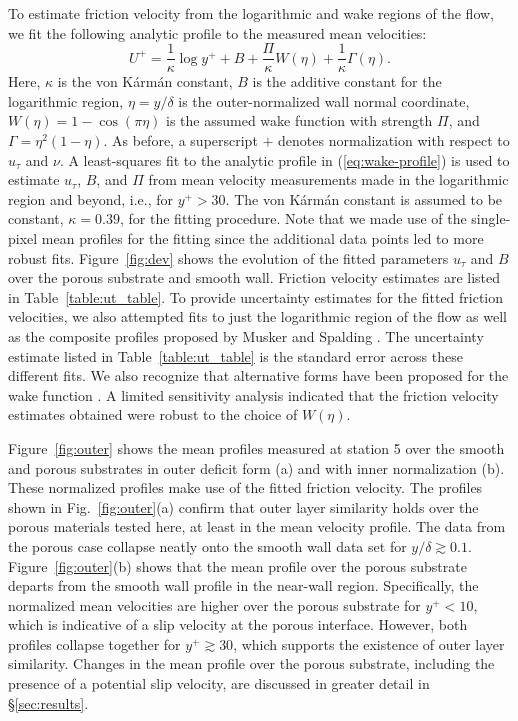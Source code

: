 \documentclass[letterpaper,11pt]{article}
\begin{document}
To estimate friction velocity from the logarithmic and wake regions of the flow, we fit the following analytic profile \citep{coles1956law,musker1979explicit,chauhan2009criteria} to the measured mean velocities:
\begin{equation}\label{eq:wake-profile}
U^+ = \frac{1}{\kappa} \log y^+ + B + \frac{\Pi}{\kappa} W(\eta) + \frac{1}{\kappa}\Gamma(\eta). 
\end{equation}
Here, $\kappa$ is the von K\'arm\'an constant, $B$ is the additive constant for the logarithmic region, $\eta = y/\delta$ is the outer-normalized wall normal coordinate, $W(\eta) = 1 - \cos(\pi\eta)$ is the assumed wake function with strength $\Pi$, and $\Gamma = \eta^2 (1-\eta)$. As before, a superscript $+$ denotes normalization with respect to $u_\tau$ and $\nu$.  A least-squares fit to the analytic profile in (\ref{eq:wake-profile}) is used to estimate $u_\tau$, $B$, and $\Pi$ from mean velocity measurements made in the logarithmic region and beyond, i.e., for $y^+ > 30$. The von K\'arm\'an constant is assumed to be constant, $\kappa = 0.39$, for the fitting procedure. Note that we made use of the single-pixel mean profiles for the fitting since the additional data points led to more robust fits.  Figure~\ref{fig:dev} shows the evolution of the fitted parameters $u_\tau$ and $B$ over the porous substrate and smooth wall.  Friction velocity estimates are listed in Table~\ref{table:ut_table}.  To provide uncertainty estimates for the fitted friction velocities, we also attempted fits to just the logarithmic region of the flow as well as the composite profiles proposed by Musker and Spalding \citep{clauser1956turbulent,musker1979explicit,kendall2006method,rodriguez2015robust}. The uncertainty estimate listed in Table~\ref{table:ut_table} is the standard error across these different fits. We also recognize that alternative forms have been proposed for the wake function \citep{chauhan2009criteria}.  A limited sensitivity analysis indicated that the friction velocity estimates obtained were robust to the choice of $W(\eta)$. 

Figure~\ref{fig:outer} shows the mean profiles measured at station 5 over the smooth and porous substrates in outer deficit form (a) and with inner normalization (b). These normalized profiles make use of the fitted friction velocity. The profiles shown in Fig.~\ref{fig:outer}(a) confirm that outer layer similarity holds over the porous materials tested here, at least in the mean velocity profile. The data from the porous case collapse neatly onto the smooth wall data set for $y/\delta \gtrsim 0.1$.  Figure~\ref{fig:outer}(b) shows that the mean profile over the porous substrate departs from the smooth wall profile in the near-wall region. Specifically, the normalized mean velocities are higher over the porous substrate for $y^+ < 10$, which is indicative of a slip velocity at the porous interface. However, both profiles collapse together for $y^+ \gtrsim 30$, which supports the existence of outer layer similarity. Changes in the mean profile over the porous substrate, including the presence of a potential slip velocity, are discussed in greater detail in \S\ref{sec:results}. 
\end{document}

